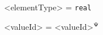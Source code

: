 \begin{minipage}{0.30\textwidth}
\begin{grammar}
<elementType> \realParam{} = \texttt{real}
\end{grammar}
\end{minipage}
\hfill
\begin{minipage}{0.35\textwidth}
\begin{grammar}
<valueId> \realParam{} = <valueId>$^\Psi$
\end{grammar}
\end{minipage}